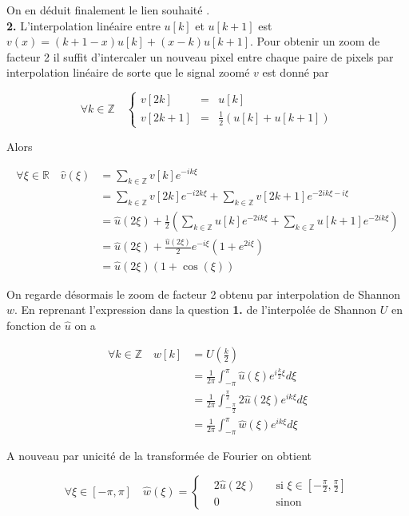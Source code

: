 \documentclass[a4paper, 11pt]{article}
\begin{document}
On en déduit finalement le lien souhaité . \\

\textbf{2.} L'interpolation linéaire entre $u[k]$ et $u[k+1]$ est $v(x) = (k+1-x)u[k] + (x-k)u[k+1]$. Pour obtenir un
zoom de facteur 2 il suffit d'intercaler un nouveau pixel entre chaque paire de pixels par interpolation linéaire de sorte 
que le signal zoomé $v$ est donné par

$$ \forall k \in \mathbb{Z}  \quad \left\lbrace
\begin{array}{lll}
  v[2k]&=& u[k] \\
  v[2k+1]&=& \frac{1}{2}(u[k] + u[k+1])
\end{array}
\right.$$

\clearpage

Alors 

\begin{align*}
  \forall \xi \in \mathbb{R} \quad  \hat{v}(\xi) &= \sum_{k \in \mathbb{Z}} v[k] e^{-ik\xi} \\ 
  &= \sum_{k \in \mathbb{Z}} v[2k] e^{-i2k\xi} + \sum_{k \in \mathbb{Z}} v[2k+1] e^{-2ik\xi - i\xi} \\
  &= \hat{u}(2\xi) + \frac{1}{2} \left( \sum_{k \in \mathbb{Z}} u[k] e^{-2ik\xi} + \sum_{k \in \mathbb{Z}} u[k+1]
e^{-2ik\xi} \right) \\
  &= \hat{u}(2\xi) + \frac{\hat{u}(2\xi)}{2} e^{-i\xi} ( 1 + e^{2i\xi}) \\
  &= \hat{u}(2\xi) (1+\cos(\xi))
\end{align*}

On regarde désormais le zoom de facteur 2 obtenu par interpolation de Shannon $w$. En reprenant l'expression dans la question 
\textbf{1.} de l'interpolée de Shannon $U$ en fonction de $\hat{u}$ on a

\begin{align*}
  \forall k \in \mathbb{Z} \quad w[k] &= U(\frac{k}{2}) \\
  &= \frac{1}{2\pi} \int_{-\pi}^{\pi} \hat{u}(\xi) e^{i\frac{k}{2}\xi} d\xi \\
  &= \frac{1}{2\pi} \int_{-\frac{\pi}{2}}^{\frac{\pi}{2}} 2\hat{u}(2\xi) e^{ik\xi} d\xi \\
  &= \frac{1}{2\pi} \int_{-\pi}^{\pi} \hat{w}(\xi) e^{ik\xi} d\xi
\end{align*}

A nouveau par unicité de la transformée de Fourier on obtient

$$ \forall \xi \in [-\pi, \pi]  \quad  \hat{w}(\xi)=\left\lbrace
\begin{array}{lll}
  &2\hat{u}(2\xi) \quad &\text{si } \xi \in [-\frac{\pi}{2}, \frac{\pi}{2}] \\
  &0 \quad &\text{sinon} 
\end{array}
\right.$$
\end{document}

